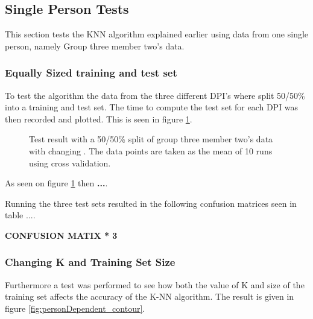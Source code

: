

\subsection{Single Person Tests}
This section tests the KNN algorithm explained earlier using data from one single person, namely Group three member two's data.
%
%
%
%

\subsubsection{Equally Sized training and test set}
To test the algorithm the data from the three different DPI's where split 50/50\% into a training and test set. The time to compute the test set for each DPI was then recorded and plotted. This is seen in figure \ref{fig:PersonDependent_5050}.

\begin{figure}[H]
\centering
\caption{Test result with a 50/50\% split of group three member two's data with changing . The data points are taken as the mean of 10 runs using cross validation.}
\label{fig:PersonDependent_5050}
\end{figure}

As seen on figure \ref{fig:PersonDependent_5050} then \textbf{...}.

Running the three test sets resulted in the following confusion matrices seen in table ....

\textbf{CONFUSION MATIX * 3}




\subsubsection{Changing K and Training Set Size}
Furthermore a test was performed to see how both the value of K and size of the training set affects the accuracy of the K-NN algorithm. The result is given in figure \ref{fig:personDependent_contour}.

